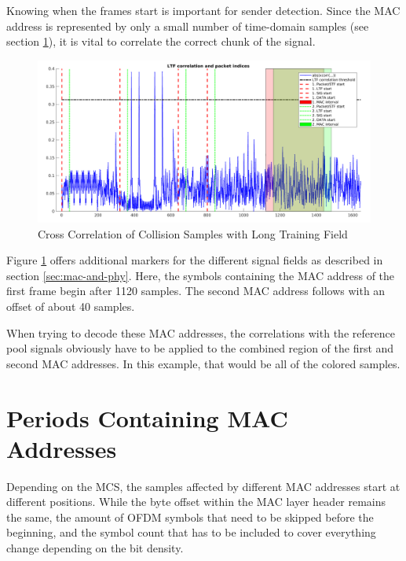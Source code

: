 Knowing when the frames start is important for sender detection. Since the \gls{MAC} address is represented by only a small number of time-domain samples (see section \ref{sec:mac-periods}), it is vital to correlate the correct chunk of the signal.

\begin{figure}[H]
	\centering
	\includegraphics[width=\textwidth]{gfx/plots/preamble}
	\caption{Cross Correlation of Collision Samples with Long Training Field}
	\label{fig:preamble-corr}
\end{figure}

Figure \ref{fig:preamble-corr} offers additional markers for the different signal fields as described in section \ref{sec:mac-and-phy}. Here, the symbols containing the \gls{MAC} address of the first frame begin after 1120 samples. The second \gls{MAC} address follows with an offset of about 40 samples.

When trying to decode these \gls{MAC} addresses, the correlations with the reference pool signals obviously have to be applied to the combined region of the first and second \gls{MAC} addresses. In this example, that would be all of the colored samples.



\section{Periods Containing MAC Addresses}\label{sec:mac-periods}

Depending on the \gls{MCS}, the samples affected by different \gls{MAC} addresses start at different positions. While the byte offset within the \gls{MAC} layer header remains the same, the amount of \gls{OFDM} symbols that need to be skipped before the beginning, and the symbol count that has to be included to cover everything change depending on the bit density.

